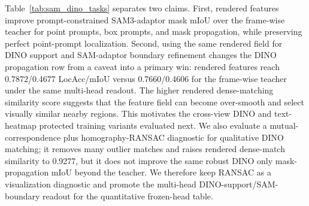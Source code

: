 \documentclass[10pt,twocolumn,letterpaper]{article}
\begin{document}
\begin{table}[t]
\centering
\caption{Promptable SAM3-adaptor and dense DINOv3-adaptor tasks on LERF-OVS.
These probes use the same annotations as the grounding benchmark but replace
text queries with adaptor-space prompts or source-target correspondences. SAM3
point/box prompts are prompt-constrained, mask propagation uses source-view
support only, and no external SAM3 mask decoder is called. DINO mask
propagation uses source-background contrast 1.10 plus GT-free multi-head
readout: top-$k$ foreground pooling, 2.0$\times$ propagated-area scaling,
peak-component cleanup, and SAM-adaptor boundary refinement.}
\label{tab:sam_dino_tasks}
\end{table}

Table~\ref{tab:sam_dino_tasks} separates two claims. First, rendered features
improve prompt-constrained SAM3-adaptor mask mIoU over the frame-wise teacher
for point prompts, box prompts, and mask propagation, while preserving perfect
point-prompt localization. Second, using the same rendered field for DINO
support and SAM-adaptor boundary refinement changes the DINO propagation row
from a caveat into a primary win: rendered features reach 0.7872/0.4677
LocAcc/mIoU versus 0.7660/0.4606 for the frame-wise teacher under the same
multi-head readout. The higher rendered
dense-matching similarity score suggests that the feature field can become
over-smooth and select visually similar nearby regions. This motivates the
cross-view DINO and text-heatmap protected training variants evaluated next.
We also evaluate a mutual-correspondence plus homography-RANSAC diagnostic for
qualitative DINO matching; it removes many outlier matches and raises rendered
dense-match similarity to 0.9277, but it does not improve the same robust DINO
only mask-propagation mIoU beyond the teacher. We therefore keep RANSAC as a
visualization diagnostic and promote the multi-head DINO-support/SAM-boundary
readout for the quantitative frozen-head table.
\end{document}
